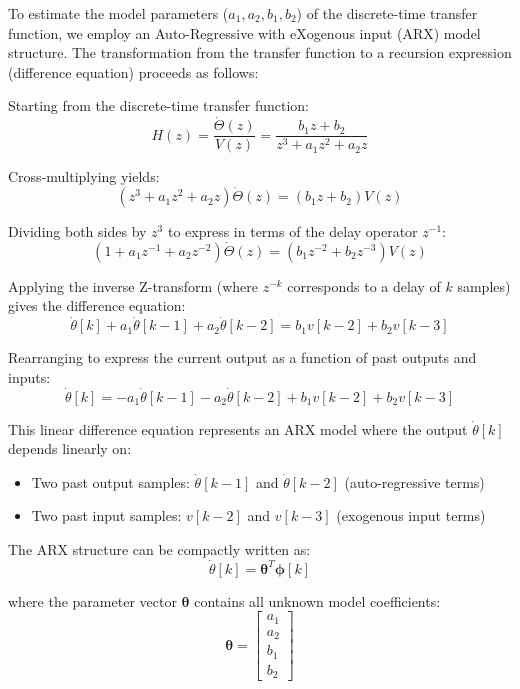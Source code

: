 \documentclass{article}
\begin{document}
	To estimate the model parameters ($a_1, a_2, b_1, b_2$) of the discrete-time transfer function, we employ an Auto-Regressive with eXogenous input (ARX) model structure. The transformation from the transfer function to a recursion expression (difference equation) proceeds as follows:
	
	Starting from the discrete-time transfer function:
	\[
	H(z) = \frac{\dot{\Theta}(z)}{V(z)} = \frac{b_1 z + b_2}{z^3 + a_1 z^2 + a_2z}
	\]
	
	Cross-multiplying yields:
	\[
	(z^3 + a_1z^2 + a_2z)\dot{\Theta}(z) = (b_1z + b_2)V(z)
	\]
	
	Dividing both sides by $z^3$ to express in terms of the delay operator $z^{-1}$:
	\[
	(1 + a_1z^{-1} + a_2z^{-2})\dot{\Theta}(z) = (b_1z^{-2} + b_2z^{-3})V(z)
	\]
	
	Applying the inverse Z-transform (where $z^{-k}$ corresponds to a delay of $k$ samples) gives the difference equation:
	\begin{equation}
		\dot{\theta}[k] + a_1\dot{\theta}[k-1] + a_2\dot{\theta}[k-2] = b_1 v[k-2] + b_2 v[k-3]
		\label{eq: difference eq}
	\end{equation}
	
	Rearranging to express the current output as a function of past outputs and inputs:
	\begin{equation}
		\dot{\theta}[k] = -a_1\dot{\theta}[k-1] - a_2\dot{\theta}[k-2] + b_1 v[k-2] + b_2 v[k-3]
		\label{eq: difference eq ARX}
	\end{equation}
	
	This linear difference equation represents an ARX model where the output $\dot{\theta}[k]$ depends linearly on:
	\begin{itemize}
		\item Two past output samples: $\dot{\theta}[k-1]$ and $\dot{\theta}[k-2]$ (auto-regressive terms)
		\item Two past input samples: $v[k-2]$ and $v[k-3]$ (exogenous input terms)
	\end{itemize}
	
	The ARX structure can be compactly written as:
	\begin{equation}
		\dot{\theta}[k] = \boldsymbol{\theta}^T \boldsymbol{\phi}[k]
		\label{eq: ARX form}
	\end{equation}
	
	where the parameter vector $\boldsymbol{\theta}$ contains all unknown model coefficients:
	\begin{equation}
		\boldsymbol{\theta} = \begin{bmatrix} a_1 \\ a_2 \\ b_1 \\ b_2 \end{bmatrix}
	\end{equation}
	
\end{document}
